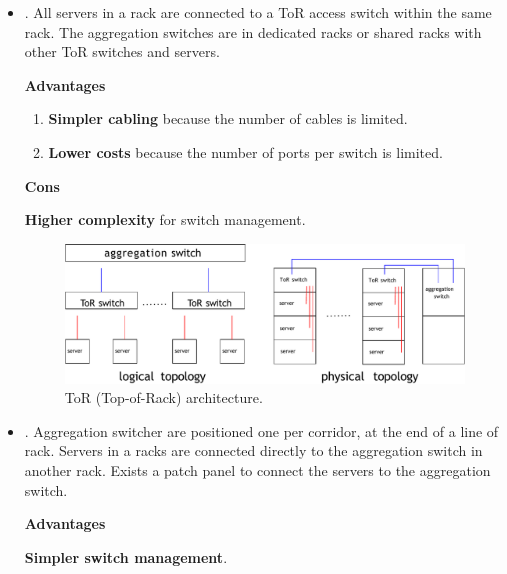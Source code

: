 \begin{itemize}
    \item {}. All servers in a rack are connected to a ToR access switch within the same rack. The aggregation switches are in dedicated racks or shared racks with other ToR switches and servers.\label{ToR (Top-of-Rack) architecture}
    
    \begin{flushleft}
        \textcolor{Green3}{ \textbf{Advantages}}
    \end{flushleft}
    \begin{enumerate}
        \item \textbf{Simpler cabling} because the number of cables is limited.
        \item \textbf{Lower costs} because the number of ports per switch is limited.
    \end{enumerate}

    \begin{flushleft}
        \textcolor{Red2}{ \textbf{Cons}}
    \end{flushleft}
    \textbf{Higher complexity} for switch management.

    \begin{figure}[!htp]
        \centering
        \includegraphics[width=.9\textwidth]{img/networking-2.pdf}
        \caption{ToR (Top-of-Rack) architecture.}
    \end{figure}

    
    \item {}. Aggregation switcher are positioned one per corridor, at the end of a line of rack. Servers in a racks are connected directly to the aggregation switch in another rack. Exists a patch panel to connect the servers to the aggregation switch.\label{EoR (End-of-Row) architecture}
    
    \begin{flushleft}
        \textcolor{Green3}{ \textbf{Advantages}}
    \end{flushleft}
    \textbf{Simpler switch management}.


\end{itemize}
